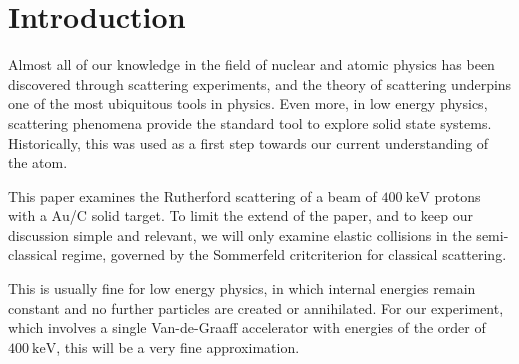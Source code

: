 \section{Introduction} 
Almost all of our knowledge in the field of nuclear and atomic physics has been
discovered through scattering experiments, and the theory of scattering underpins
one of the most ubiquitous tools in physics.
Even more, in low energy physics, scattering phenomena provide the standard tool to
explore solid state systems. Historically, this was used as a first step
towards our current understanding of the atom.


This paper examines the Rutherford scattering of a beam of $\SI{400}{\kilo\electronvolt}$
protons with a $\mathrm{Au}$/$\mathrm{C}$ solid target. To limit the extend of
the paper, and to keep our discussion simple and relevant, we will only examine
elastic collisions in the semi-classical regime, governed by the Sommerfeld
critcriterion for classical scattering. \parencite[p. 14]{noteBB}

This is usually fine for low energy physics, in which internal energies remain
constant and no further particles are created or annihilated.
For our experiment, which involves a single Van-de-Graaff accelerator with
energies of the order of $\SI{400}{\kilo\electronvolt}$, this will be a very
fine approximation.

\vfill


